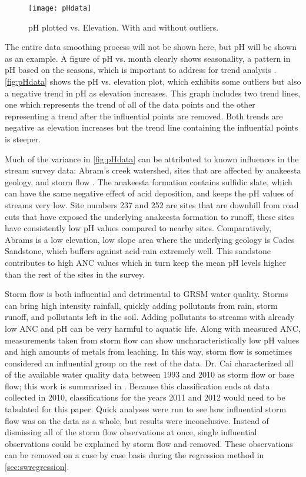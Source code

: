 \begin{figure}[h!]
\centering
    \texttt{[image: pHdata]}\\
    \caption{pH plotted vs. Elevation. With and without outliers.}
    \label{fig:pHdata}
\end{figure}

The entire data smoothing process will not be shown here, but pH will be shown as an example.
A figure of pH vs. month clearly shows seasonality, a pattern in pH based on the seasons, which is important to address for trend analysis \citep{helsel1992statistical}.
\autoref{fig:pHdata} shows the pH vs. elevation plot, which exhibits some outliers but also a negative trend in pH as elevation increases.
This graph includes two trend lines, one which represents the trend of all of the data points and the other representing a trend after the influential points are removed. 
Both trends are negative as elevation increases but the trend line containing the influential points is steeper. 

Much of the variance in \autoref{fig:pHdata} can be attributed to known influences in the stream survey data: Abram's creek watershed, sites that are affected by anakeesta geology, and storm flow \citep{neff2012influence}.  
The anakeesta formation contains sulfidic slate, which can have the same negative effect of acid deposition,  and keeps the pH values of streams very low.
Site numbers 237 and 252 are sites that are downhill from road cuts that have exposed the underlying anakeesta formation to runoff, these sites have consistently low pH values compared to nearby sites.  
Comparatively, Abrams is a low elevation, low slope area where the underlying geology is Cades Sandstone, which buffers against acid rain extremely well. 
This sandstone contributes to high ANC values which in turn keep the mean pH levels higher than the rest of the sites in the survey. 

Storm flow is both influential and detrimental  to GRSM water quality. 
Storms can bring high intensity rainfall, quickly adding pollutants from rain, storm runoff, and pollutants left in the soil.
Adding pollutants to streams with already low ANC and pH can be very harmful to aquatic life.
Along with measured ANC, measurements taken from storm flow can show uncharacteristically low pH values and high amounts of metals from leaching. 
In this way, storm flow is sometimes considered an influential group on the rest of the data. 
Dr. Cai characterized all of the available water quality data between 1993 and 2010 as storm flow or base flow; this work is summarized in \citet{cai2013}. 
Because this classification ends at data collected in 2010, classifications for the years 2011 and 2012 would need to be tabulated for this paper.
Quick analyses were run to see how influential storm flow was on the data as a whole, but results were inconclusive. 
Instead of dismissing all of the storm flow observations at once, single influential observations could be explained by storm flow and removed. 
These observations can be removed on a case by case basis during the regression method in \autoref{sec:swregression}.

